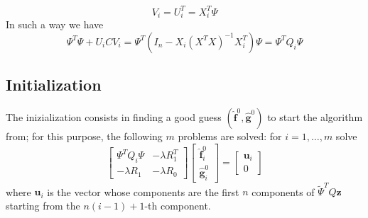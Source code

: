 \begin{equation}
	V_i = U_i^T = X^T_i\Psi
\end{equation}
In such a way we have
\begin{equation}
	\Psi^T\Psi +  U_iCV_i = \Psi^T \left( I_n-X_i\left(X^TX\right)^{-1}X_i^T \right) \Psi = \Psi^T Q_i \Psi
\end{equation}

\subsection{Initialization}
The inizialization consists in finding a good guess
$(\hat{\mathbf{f}}^0,\hat{\mathbf{g}}^0)$ to start the algorithm from; for this
purpose, the following $m$ problems are solved: for $i = 1, \dots, m$ solve
\begin{equation}
	\begin{bmatrix}
		\Psi^TQ_i\Psi & -\lambda R_1^T \\
		-\lambda R_1  & -\lambda R_0
	\end{bmatrix}
	\begin{bmatrix}
		\hat{\mathbf{f}}_i^0 \\
		\hat{\mathbf{g}}_i^0
	\end{bmatrix}
	=
	\begin{bmatrix}
		\mathbf{u}_i \\
		0
	\end{bmatrix}
\end{equation}
where $\mathbf{u}_i$ is the vector whose components are the first $n$
components of $\tilde{\Psi}^T Q\mathbf{z}$ starting from the $n(i-1) +1$-th
component.

